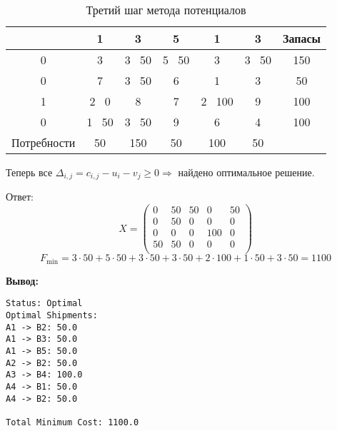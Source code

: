 \documentclass[17pt]{extarticle}
\begin{document}
\begin{table}[h!]
    \centering
    \begin{tabular}{c|ccccc|c}
        \toprule
                    & 1      & 3      & 5      & 1       & 3      & Запасы \\
        \midrule
        0           & 3      & 3 \ 50 & 5 \ 50 & 3       & 3 \ 50 & 150    \\
        0           & 7      & 3 \ 50 & 6      & 1       & 3      & 50     \\
        1           & 2 \ 0  & 8      & 7      & 2 \ 100 & 9      & 100    \\
        0           & 1 \ 50 & 3 \ 50 & 9      & 6       & 4      & 100    \\
        \midrule
        Потребности & 50     & 150    & 50     & 100     & 50     &        \\
        \bottomrule
    \end{tabular}
    \caption{Третий шаг метода потенциалов}
\end{table}

Теперь все \(\Delta_{i,j} = c_{i,j} - u_i - v_j \geq 0 \Rightarrow\)  найдено оптимальное решение.

Ответ:
\[
    X =
    \begin{pmatrix}
        0  & 50 & 50 & 0   & 50 \\
        0  & 50 & 0  & 0   & 0  \\
        0  & 0  & 0  & 100 & 0  \\
        50 & 50 & 0  & 0   & 0  \\
    \end{pmatrix}
\]
\[
    F_{\text{min}} = 3 \cdot 50 + 5 \cdot 50 + 3 \cdot 50 + 3 \cdot 50 + 2 \cdot 100 + 1 \cdot 50 + 3 \cdot 50 = 1100
\]


\textbf{Вывод:}
\begin{verbatim}
Status: Optimal
Optimal Shipments:
A1 -> B2: 50.0
A1 -> B3: 50.0
A1 -> B5: 50.0
A2 -> B2: 50.0
A3 -> B4: 100.0
A4 -> B1: 50.0
A4 -> B2: 50.0

Total Minimum Cost: 1100.0
\end{verbatim}
\end{document}
